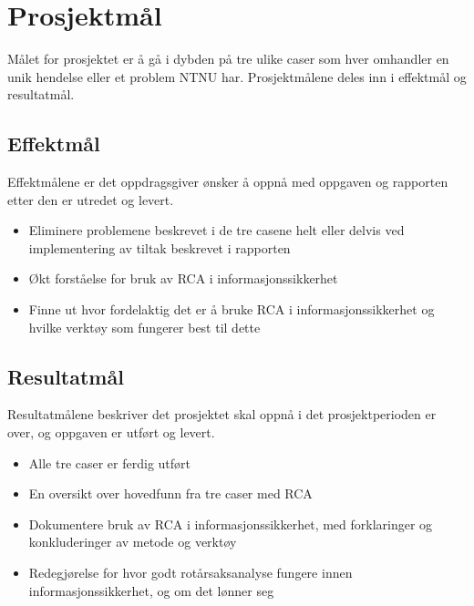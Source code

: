 \section{Prosjektmål}
\label{sec:prosjektmaal}
Målet for prosjektet er å gå i dybden på tre ulike caser som hver omhandler en unik hendelse eller et problem NTNU har. Prosjektmålene deles inn i effektmål og resultatmål.

\subsection{Effektmål}
Effektmålene er det oppdragsgiver ønsker å oppnå med oppgaven og rapporten etter den er utredet og levert.
\begin{itemize}
    \item Eliminere problemene beskrevet i de tre casene helt eller delvis ved implementering av tiltak beskrevet i rapporten
    \item Økt forståelse for bruk av RCA i informasjonssikkerhet
    \item Finne ut hvor fordelaktig det er å bruke RCA i informasjonssikkerhet og hvilke verktøy som fungerer best til dette
\end{itemize}

\subsection{Resultatmål}
Resultatmålene beskriver det prosjektet skal oppnå i det prosjektperioden er over, og oppgaven er utført og levert.

\begin{itemize}
    \item Alle tre caser er ferdig utført
    \item En oversikt over hovedfunn fra tre caser med RCA
    \item Dokumentere bruk av RCA i informasjonssikkerhet, med forklaringer og konkluderinger av metode og verktøy
    \item Redegjørelse for hvor godt rotårsaksanalyse fungere innen informasjonssikkerhet, og om det lønner seg
\end{itemize}